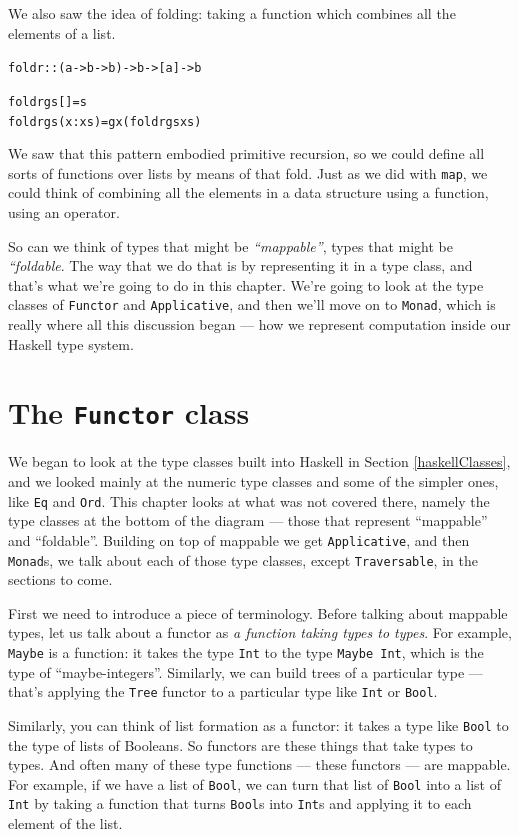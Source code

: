 We also saw the idea of folding: taking a function which combines all the elements of a list.
\begin{alltt}
foldr :: (a -> b -> b) -> b -> [a] -> b

foldr g s []     = s
foldr g s (x:xs) = g x (foldr g s xs)   
\end{alltt}
We saw that this pattern embodied primitive recursion, so we could define all sorts of functions over lists by means of that fold. Just as we did with \texttt{map}, we could think of combining all the elements in a data structure using a function, using an operator. 

So can we think of types that might be \emph{``mappable''}, types that might be \emph{``foldable}. The way that we do that is by representing it in a type class, and that's what we're going to do in this chapter. We're going to look at the type classes of \texttt{Functor} and \texttt{Applicative}, and then we'll move on to \texttt{Monad}, which is really where all this discussion began — how we represent computation inside our Haskell type system.

\section{The \texttt{Functor} class}

We began to look at the type classes built into Haskell in Section \ref{haskellClasses}, and we looked mainly at the numeric type classes and some of the simpler ones, like \texttt{Eq} and \texttt{Ord}. This chapter looks at what was not covered there, namely the type classes at the bottom of the diagram — those that represent ``mappable'' and ``foldable''. Building on top of mappable we get \texttt{Applicative}, and then \texttt{Monad}s, we talk about each of those type classes, except \texttt{Traversable}, in the sections to come.

First we need to introduce a piece of terminology. Before talking about mappable types, let us talk about a functor as \emph{a function taking types to types}. For example, \texttt{Maybe} is a function: it takes the type \texttt{Int} to the type \texttt{Maybe Int}, which is the type of ``maybe-integers''. Similarly, we can build trees of a particular type — that's applying the \texttt{Tree} functor to a particular type like \texttt{Int} or \texttt{Bool}.

Similarly, you can think of list formation as a functor: it takes a type like \texttt{Bool} to the type of lists of Booleans. So functors are these things that take types to types. And often many of these type functions — these functors — are mappable. For example,  if we have a list of \texttt{Bool}, we can turn that list of \texttt{Bool} into a list of \texttt{Int} by taking a function that turns \texttt{Bool}s into \texttt{Int}s and applying it to each element of the list.

